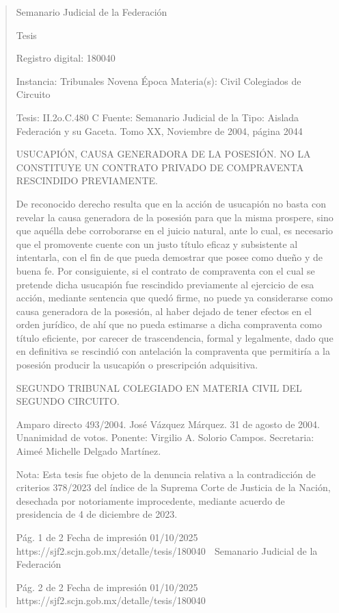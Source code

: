 \documentclass[11pt,a4paper]{article}
\begin{document}
\begin{quote}
                                                   Semanario Judicial de la Federación

                                                  Tesis

 Registro digital: 180040

 Instancia: Tribunales             Novena Época                          Materia(s): Civil
 Colegiados de Circuito

 Tesis: II.2o.C.480 C              Fuente: Semanario Judicial de la      Tipo: Aislada
                                   Federación y su Gaceta.
                                   Tomo XX, Noviembre de 2004,
                                   página 2044


USUCAPIÓN, CAUSA GENERADORA DE LA POSESIÓN. NO LA CONSTITUYE UN CONTRATO
PRIVADO DE COMPRAVENTA RESCINDIDO PREVIAMENTE.


De reconocido derecho resulta que en la acción de usucapión no basta con revelar la causa
generadora de la posesión para que la misma prospere, sino que aquélla debe corroborarse en el
juicio natural, ante lo cual, es necesario que el promovente cuente con un justo título eficaz y
subsistente al intentarla, con el fin de que pueda demostrar que posee como dueño y de buena fe.
Por consiguiente, si el contrato de compraventa con el cual se pretende dicha usucapión fue
rescindido previamente al ejercicio de esa acción, mediante sentencia que quedó firme, no puede ya
considerarse como causa generadora de la posesión, al haber dejado de tener efectos en el orden
jurídico, de ahí que no pueda estimarse a dicha compraventa como título eficiente, por carecer de
trascendencia, formal y legalmente, dado que en definitiva se rescindió con antelación la
compraventa que permitiría a la posesión producir la usucapión o prescripción adquisitiva.

SEGUNDO TRIBUNAL COLEGIADO EN MATERIA CIVIL DEL SEGUNDO CIRCUITO.


Amparo directo 493/2004. José Vázquez Márquez. 31 de agosto de 2004. Unanimidad de votos.
Ponente: Virgilio A. Solorio Campos. Secretaria: Aimeé Michelle Delgado Martínez.

Nota: Esta tesis fue objeto de la denuncia relativa a la contradicción de criterios 378/2023 del índice
de la Suprema Corte de Justicia de la Nación, desechada por notoriamente improcedente, mediante
acuerdo de presidencia de 4 de diciembre de 2023.




                                              Pág. 1 de 2             Fecha de impresión 01/10/2025
  https://sjf2.scjn.gob.mx/detalle/tesis/180040
                                                Semanario Judicial de la Federación




                                           Pág. 2 de 2       Fecha de impresión 01/10/2025
https://sjf2.scjn.gob.mx/detalle/tesis/180040

\end{quote}
\end{document}
